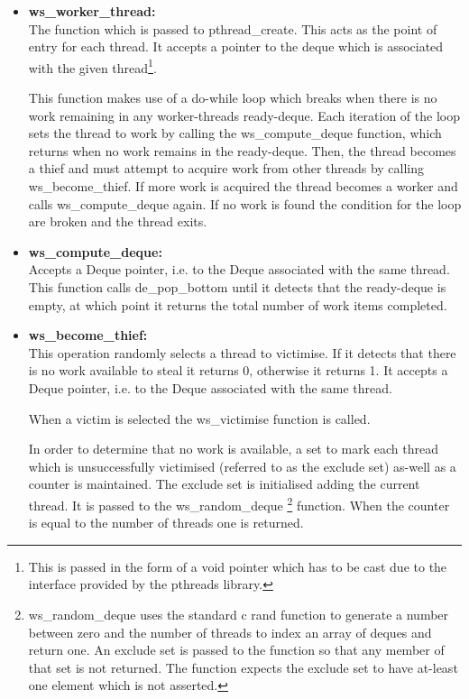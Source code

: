 \begin{itemize}
\item \textbf{ws\_worker\_thread: } \\
                The function which is passed to pthread\_create. This acts as the point of entry for each \gls{thread}.
                It accepts a pointer to the deque which is associated with the given thread\footnote{This is passed 
                in the form of a void pointer which has to be cast due to the interface provided by the pthreads
                library.}.
              
                This function makes use of a do-while loop which breaks when there is no work remaining in any \glspl{worker-thread} \gls{ready-deque}. 
                Each iteration of the loop sets the thread to work by calling the ws\_compute\_deque function, which returns when 
                no work remains in the \gls{ready-deque}. Then, the thread becomes a \gls{thief} and must attempt to acquire work
                from other threads by calling ws\_become\_thief. If more work is acquired the thread becomes a worker and calls ws\_compute\_deque
                again. If no work is found the condition for the loop are broken and the thread exits.
              
\item \textbf{ws\_compute\_deque: } \\
                Accepts a Deque pointer, i.e. to the Deque associated with the same thread. This function 
                calls de\_pop\_bottom until it detects that the ready-deque is empty, at which point it returns
                the total number of work items completed.
                
\item \textbf{ws\_become\_thief: } \\
                This operation randomly selects a thread to victimise. If it detects that there is no work
                available to steal it returns 0, otherwise it returns 1.
                It accepts a Deque pointer, i.e. to the Deque associated with the same thread. 
                
                When a victim is selected the ws\_victimise function is called.
                
                In order to determine that no work is available, a set to mark each thread which is unsuccessfully victimised (referred to as
                the exclude set) as-well as a counter is maintained.
                The exclude set is initialised adding the current thread. It is passed to the ws\_random\_deque
                \footnote{ws\_random\_deque uses 
                the standard c rand function to generate a number between zero and the number of threads to index an array 
                of deques and return one. An exclude set is passed to the function so that any member of that set is not returned.
                The function expects the exclude set to have at-least one element which is not asserted.}
                function. When the counter is equal to the number of threads one is returned.
                

\end{itemize}
